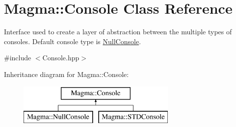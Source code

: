 \hypertarget{class_magma_1_1_console}{}\section{Magma\+:\+:Console Class Reference}
\label{class_magma_1_1_console}


Interface used to create a layer of abstraction between the multiple types of consoles. Default console type is \hyperlink{class_magma_1_1_null_console}{Null\+Console}.  




{\ttfamily \#include $<$Console.\+hpp$>$}

Inheritance diagram for Magma\+:\+:Console\+:\begin{figure}[H]
\begin{center}
\leavevmode
\includegraphics[height=2.000000cm]{class_magma_1_1_console}
\end{center}
\end{figure}
